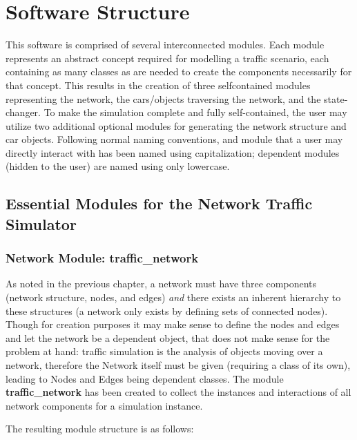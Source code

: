 \chapter{Software Structure}
\label{Structure}

\par This software is comprised of several interconnected modules.  Each module represents an abstract concept required for modelling a traffic scenario, each containing as many classes as are needed to create the components necessarily for that concept.  This results in the creation of three self\-contained modules representing the network, the cars/objects traversing the network, and the state-changer.  To make the simulation complete and fully self-contained, the user may utilize two additional optional modules for generating the network structure and car objects. Following normal naming conventions, and module that a user may directly interact with has been named using capitalization; dependent modules (hidden to the user) are named using only lowercase.

\section{Essential Modules for the Network Traffic \\ Simulator}

\subsection{Network Module:  traffic\_network}

\par As noted in the previous chapter, a network must have three components (network structure, nodes, and edges) \textit{and} there exists an inherent hierarchy to these structures (a network only exists by defining sets of connected nodes).  Though for creation purposes it may make sense to define the nodes and edges and let the network be a dependent object, that does not make sense for the problem at hand:  traffic simulation is the analysis of objects moving over a network, therefore the Network itself must be given (requiring a class of its own), leading to Nodes and Edges being dependent classes.  The module \textbf{traffic\_network} has been created to collect the instances and interactions of all network components for a simulation instance.  \\

\par The resulting module structure is as follows:

